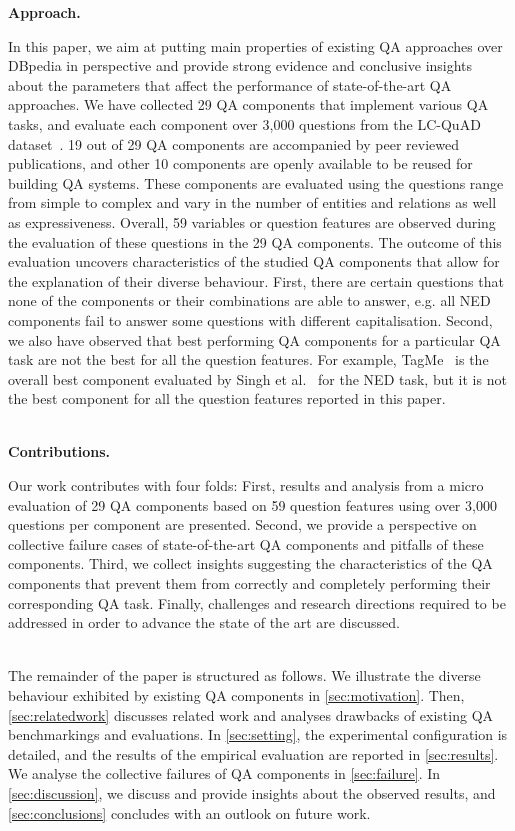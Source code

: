 \documentclass[sigconf,edbt]{acmart-edbt2019}
\begin{document}
{\bf Approach.} \begin{inparaenum}
In this paper, we aim at putting main properties of existing QA approaches over DBpedia in perspective and provide strong evidence and conclusive insights about the parameters that affect the performance of state-of-the-art QA approaches. 
We have collected 29 QA components that implement various QA tasks, and evaluate each component over 3,000 questions from the LC-QuAD dataset~\cite{trivedi2017lc}. 19 out of 29 QA components are accompanied by peer reviewed publications, and other 10 components are openly available to be reused for building QA systems. These components are evaluated using the questions range from simple to complex and vary in the number of entities and relations as well as expressiveness. Overall, 59 variables or question features are observed during the evaluation of these questions in the 29 QA components. The outcome of this evaluation uncovers characteristics of the studied QA components that allow for the explanation of their diverse behaviour. First, there are certain questions that none of the components or their combinations are able to answer, e.g. all NED components fail to answer some questions with different capitalisation. Second, we also have observed that best performing QA components for a particular QA task are not the best for all the question features. For example, TagMe~\cite{DBLP:conf/cikm/FerraginaS10} is the overall best component evaluated by Singh et al.~\cite{DBLP:conf/www/SinghRBSLUVKP0V18} for the NED task, but it is not the best component for all the question features reported in this paper.
\end{inparaenum}
~\\
{\bf Contributions.} \begin{inparaenum}
Our work contributes with four folds: First, results and analysis from a micro evaluation of 29 QA components based on 59 question features using over 3,000 questions per component are presented. Second, we provide a perspective on collective failure cases of state-of-the-art QA components and pitfalls of these components. Third, we collect insights suggesting the characteristics of the QA components that prevent them from correctly and completely performing their corresponding QA task. Finally, challenges and research directions required to be addressed in order to advance the state of the art are discussed.
\end{inparaenum}
~\\
The remainder of the paper is structured as follows. We illustrate the diverse behaviour exhibited by existing QA components in \autoref{sec:motivation}. Then, \autoref{sec:relatedwork} discusses related work and analyses drawbacks of existing QA benchmarkings and evaluations. In \autoref{sec:setting}, the experimental configuration is detailed, and the results of the empirical evaluation are reported in \autoref{sec:results}. We analyse the collective failures of QA components in \autoref{sec:failure}. In \autoref{sec:discussion}, we discuss and provide insights about the observed results, and \autoref{sec:conclusions} concludes with an outlook on future work.
\end{document}
